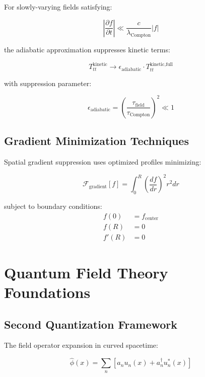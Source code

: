 \documentclass[12pt,a4paper]{article}
\begin{document}
For slowly-varying fields satisfying:

\begin{equation}
\left|\frac{\partial f}{\partial t}\right| \ll \frac{c}{\lambda_{\text{Compton}}} |f|
\end{equation}

the adiabatic approximation suppresses kinetic terms:

\begin{equation}
T_{tt}^{\text{kinetic}} \rightarrow \epsilon_{\text{adiabatic}} \cdot T_{tt}^{\text{kinetic,full}}
\end{equation}

with suppression parameter:

\begin{equation}
\epsilon_{\text{adiabatic}} = \left(\frac{\tau_{\text{field}}}{\tau_{\text{Compton}}}\right)^2 \ll 1
\end{equation}

\subsection{Gradient Minimization Techniques}

Spatial gradient suppression uses optimized profiles minimizing:

\begin{equation}
\mathcal{F}_{\text{gradient}}[f] = \int_0^R \left(\frac{df}{dr}\right)^2 r^2 dr
\end{equation}

subject to boundary conditions:
\begin{align}
f(0) &= f_{\text{center}} \\
f(R) &= 0 \\
f'(R) &= 0
\end{align}

\section{Quantum Field Theory Foundations}

\subsection{Second Quantization Framework}

The field operator expansion in curved spacetime:

\begin{equation}
\hat{\phi}(x) = \sum_n \left[a_n u_n(x) + a_n^\dagger u_n^*(x)\right]
\end{equation}
\end{document}
